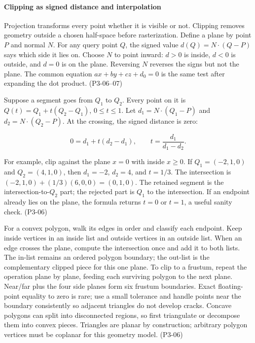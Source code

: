 \paragraph{Clipping as signed distance and interpolation}\label{clipping-as-signed-distance-and-interpolation}

Projection transforms every point whether it is visible or not. Clipping removes geometry outside a chosen half-space before rasterization. Define a plane by point \(P\) and normal \(N\). For any query point \(Q\), the signed value \(d(Q)=N\cdot(Q-P)\) says which side it lies on. Choose \(N\) to point inward: \(d>0\) is inside, \(d<0\) is outside, and \(d=0\) is on the plane. Reversing \(N\) reverses the signs but not the plane. The common equation \(ax+by+cz+d_0=0\) is the same test after expanding the dot product. (P3-06--07)

Suppose a segment goes from \(Q_1\) to \(Q_2\). Every point on it is \(Q(t)=Q_1+t(Q_2-Q_1)\), \(0\le t\le1\). Let \(d_1=N\cdot(Q_1-P)\) and \(d_2=N\cdot(Q_2-P)\). At the crossing, the signed distance is zero:

\[
0=d_1+t(d_2-d_1),\qquad t=\frac{d_1}{d_1-d_2}.
\]

For example, clip against the plane \(x=0\) with inside \(x\ge0\). If \(Q_1=(-2,1,0)\) and \(Q_2=(4,1,0)\), then \(d_1=-2\), \(d_2=4\), and \(t=1/3\). The intersection is \((-2,1,0)+(1/3)(6,0,0)=(0,1,0)\). The retained segment is the intersection-to-\(Q_2\) part; the rejected part is \(Q_1\) to the intersection. If an endpoint already lies on the plane, the formula returns \(t=0\) or \(t=1\), a useful sanity check. (P3-06)

For a convex polygon, walk its edges in order and classify each endpoint. Keep inside vertices in an inside list and outside vertices in an outside list. When an edge crosses the plane, compute the intersection once and add it to both lists. The in-list remains an ordered polygon boundary; the out-list is the complementary clipped piece for this one plane. To clip to a frustum, repeat the operation plane by plane, feeding each surviving polygon to the next plane. Near/far plus the four side planes form six frustum boundaries. Exact floating-point equality to zero is rare; use a small tolerance and handle points near the boundary consistently so adjacent triangles do not develop cracks. Concave polygons can split into disconnected regions, so first triangulate or decompose them into convex pieces. Triangles are planar by construction; arbitrary polygon vertices must be coplanar for this geometry model. (P3-06)

